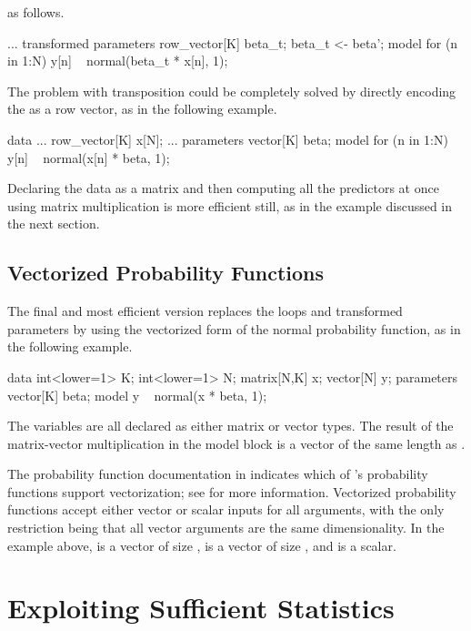 as follows.
%
\begin{stancode}
...
transformed parameters {
  row_vector[K] beta_t;
  beta_t <- beta';
}
model {
  for (n in 1:N)
    y[n] ~ normal(beta_t * x[n], 1);
}
\end{stancode}
%
The problem with transposition could be completely solved by directly
encoding the  as a row vector, as in the
following example.
%
\begin{stancode}
data {
  ...
  row_vector[K] x[N];
  ...
}
parameters {
  vector[K] beta;
}
model {
  for (n in 1:N)
    y[n] ~ normal(x[n] * beta, 1);
}
\end{stancode}
%
Declaring the data as a matrix and then computing all the predictors
at once using matrix multiplication is more efficient still, as in the
example discussed in the next section.

\subsection{Vectorized Probability Functions}

The final and most efficient version replaces the loops and
transformed parameters by using the vectorized form of the normal
probability function, as in the following example.
%
\begin{stancode}
data {
  int<lower=1> K;
  int<lower=1> N;
  matrix[N,K] x;
  vector[N] y;
}
parameters {
  vector[K] beta;
} 
model {
  y ~ normal(x * beta, 1);
}
\end{stancode}
%
The variables are all declared as either matrix or vector types.
The result of the matrix-vector multiplication  in the
model block is a vector of the same length as .  

The probability function documentation in 
indicates which of \Stan's probability functions support
vectorization; see  for more
information.  Vectorized probability functions accept either vector or
scalar inputs for all arguments, with the only restriction being that
all vector arguments are the same dimensionality.  In the example
above,  is a vector of size ,  is a
vector of size , and  is a scalar.

\section{Exploiting Sufficient Statistics}

